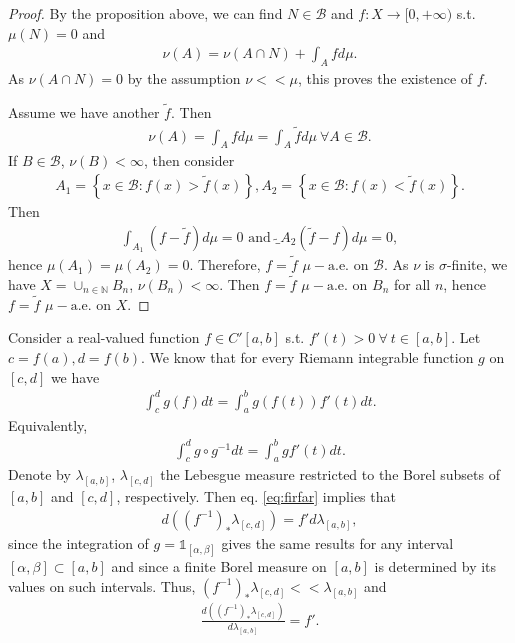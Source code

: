 \ifdetailed
\begin{proof}
    By the proposition above, we can find \(N\in\mathscr{B}\) and \(f:X\rightarrow[0,+\infty)\) s.t. \(\mu(N)=0\) and
    \begin{align*}
        \nu(A)=\nu\left(A\cap N\right) + \int_A fd\mu.
    \end{align*}
    As \(\nu(A\cap N)=0\) by the assumption \(\nu<<\mu\), this proves the existence of \(f\).
    
    Assume we have another \(\tilde{f}\). Then 
    \begin{align*}
        \nu(A)=\int_Afd\mu=\int_A\tilde{f}d\mu \ \forall A\in\mathscr{B}.
    \end{align*}
    If \(B\in\mathscr{B}\), \(\nu(B)<\infty\), then consider 
    \begin{align*}
        A_1 = \left\{x\in\mathscr{B}:f(x)>\tilde{f}(x)\right\}, A_2 = \left\{x\in\mathscr{B}:f(x)<\tilde{f}(x)\right\}. 
    \end{align*}
    Then 
    \begin{align*}
        \int_{A_1}(f-\tilde{f})d\mu = 0 \text{ and } \tilde_{A_2}(\tilde{f} - f) d\mu = 0,
    \end{align*}
    hence \(\mu(A_1)=\mu(A_2)=0\). Therefore, \(f=\tilde{f}\) \(\mu-\text{a.e.}\) on \(\mathscr{B}\). As \(\nu\) is \(\sigma\)-finite,
    we have \(X=\cup_{n\in\mathbb{N}}B_n\), \(\nu(B_n)<\infty\). Then \(f=\tilde{f}\) \(\mu-\text{a.e.}\) on \(B_n\) for all \(n\),
    hence \(f=\tilde{f}\) \(\mu-\text{a.e.}\) on \(X\).
\end{proof}
\fi
\begin{example}
    Consider a real-valued function \(f\in C'[a,b]\) s.t. \(f'(t)>0 \ \forall \ t\in[a,b]\). Let \(c=f(a), d=f(b)\). We know that for every
    Riemann integrable function \(g\) on \([c,d]\) we have
    \begin{align*}
        \int_{c}^{d}g(f)dt = \int_{a}^{b}g(f(t))f'(t)dt.
    \end{align*}
    Equivalently, 
    \begin{align}  \label{eq:firfar}
        \int_{c}^{d} g\circ g^{-1}dt = \int_{a}^{b}gf'(t)dt.
    \end{align}
    Denote by \(\lambda_{[a,b]}\), \(\lambda_{[c,d]}\) the Lebesgue measure restricted to the Borel subsets of \([a,b]\) and 
    \([c,d]\), respectively. Then eq. \ref{eq:firfar} implies that 
    \begin{align*}
        d\left((f^{-1})_{*}\lambda_{[c,d]}\right) = f'd\lambda_{[a,b]},
    \end{align*}
    since the integration of \(g=\mathds{1}_{[\alpha,\beta]}\) gives the same results for any interval \([\alpha,\beta]\subset[a,b]\)
    and since a finite Borel measure on \([a,b]\) is determined by its values on such intervals. Thus, 
    \((f^{-1})_{*}\lambda_{[c,d]}<<\lambda_{[a,b]}\) and
    \begin{align*}
        \frac{d\left((f^{-1})_{*}\lambda_{[c,d]}\right)}{d\lambda_{[a,b]}} = f'.
    \end{align*}
\end{example}